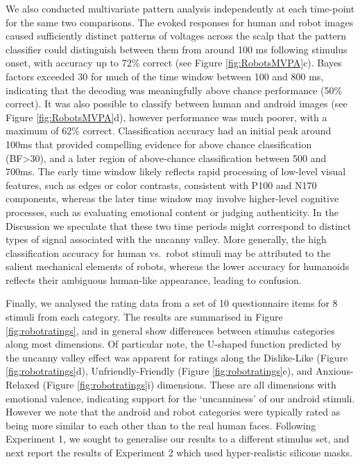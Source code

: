 \documentclass[
]{article}
\begin{document}
We also conducted multivariate pattern analysis independently at each time-point for the same two comparisons. The evoked responses for human and robot images caused sufficiently distinct patterns of voltages across the scalp that the pattern classifier could distinguish between them from around 100 ms following stimulus onset, with accuracy up to 72\% correct (see Figure \ref{fig:RobotsMVPA}c). Bayes factors exceeded 30 for much of the time window between 100 and 800 ms, indicating that the decoding was meaningfully above chance performance (50\% correct). It was also possible to classify between human and android images (see Figure \ref{fig:RobotsMVPA}d), however performance was much poorer, with a maximum of 62\% correct. Classification accuracy had an initial peak around 100ms that provided compelling evidence for above chance classification (BF\textgreater30), and a later region of above-chance classification between 500 and 700ms. The early time window likely reflects rapid processing of low-level visual features, such as edges or color contrasts, consistent with P100 and N170 components, whereas the later time window may involve higher-level cognitive processes, such as evaluating emotional content or judging authenticity. In the Discussion we speculate that these two time periods might correspond to distinct types of signal associated with the uncanny valley. More generally, the high classification accuracy for human vs.~robot stimuli may be attributed to the salient mechanical elements of robots, whereas the lower accuracy for humanoids reflects their ambiguous human-like appearance, leading to confusion.

Finally, we analysed the rating data from a set of 10 questionnaire items for 8 stimuli from each category. The results are summarised in Figure \ref{fig:robotratings}, and in general show differences between stimulus categories along most dimensions. Of particular note, the U-shaped function predicted by the uncanny valley effect was apparent for ratings along the Dislike-Like (Figure \ref{fig:robotratings}d), Unfriendly-Friendly (Figure \ref{fig:robotratings}e), and Anxious-Relaxed (Figure \ref{fig:robotratings}i) dimensions. These are all dimensions with emotional valence, indicating support for the `uncanniness' of our android stimuli. However we note that the android and robot categories were typically rated as being more similar to each other than to the real human faces. Following Experiment 1, we sought to generalise our results to a different stimulus set, and next report the results of Experiment 2 which used hyper-realistic silicone masks.
\end{document}
